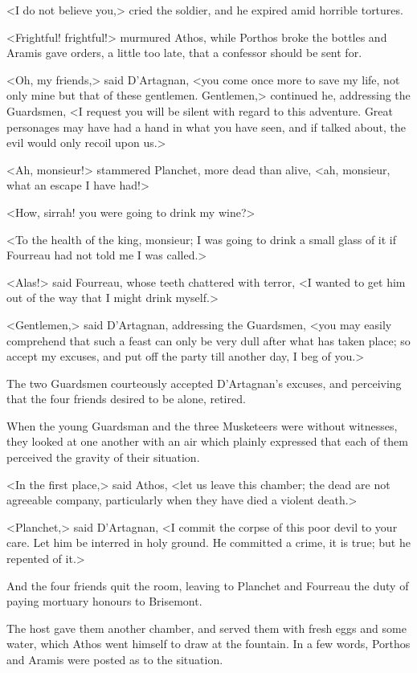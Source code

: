 <I do not believe you,> cried the soldier, and he expired amid horrible tortures. 

<Frightful! frightful!> murmured Athos, while Porthos broke the bottles and Aramis gave orders, a little too late, that a confessor should be sent for. 

<Oh, my friends,> said D'Artagnan, <you come once more to save my life, not only mine but that of these gentlemen. Gentlemen,> continued he, addressing the Guardsmen, <I request you will be silent with regard to this adventure. Great personages may have had a hand in what you have seen, and if talked about, the evil would only recoil upon us.> 

<Ah, monsieur!> stammered Planchet, more dead than alive, <ah, monsieur, what an escape I have had!> 

<How, sirrah! you were going to drink my wine?> 

<To the health of the king, monsieur; I was going to drink a small glass of it if Fourreau had not told me I was called.> 

<Alas!> said Fourreau, whose teeth chattered with terror, <I wanted to get him out of the way that I might drink myself.> 

<Gentlemen,> said D'Artagnan, addressing the Guardsmen, <you may easily comprehend that such a feast can only be very dull after what has taken place; so accept my excuses, and put off the party till another day, I beg of you.> 

The two Guardsmen courteously accepted D'Artagnan's excuses, and perceiving that the four friends desired to be alone, retired. 

When the young Guardsman and the three Musketeers were without witnesses, they looked at one another with an air which plainly expressed that each of them perceived the gravity of their situation. 

<In the first place,> said Athos, <let us leave this chamber; the dead are not agreeable company, particularly when they have died a violent death.> 

<Planchet,> said D'Artagnan, <I commit the corpse of this poor devil to your care. Let him be interred in holy ground. He committed a crime, it is true; but he repented of it.> 

And the four friends quit the room, leaving to Planchet and Fourreau the duty of paying mortuary honours to Brisemont. 

The host gave them another chamber, and served them with fresh eggs and some water, which Athos went himself to draw at the fountain. In a few words, Porthos and Aramis were posted as to the situation. 

